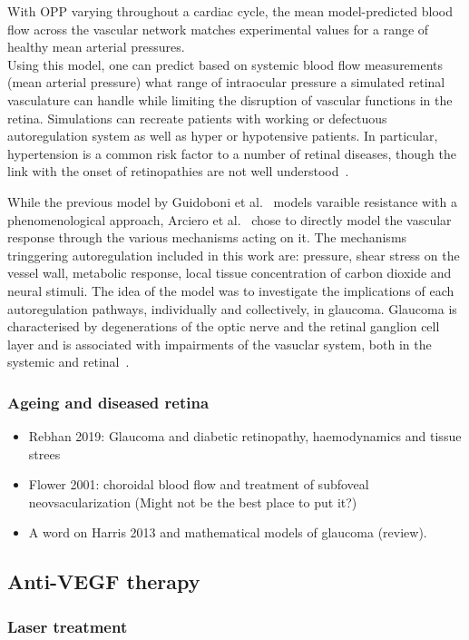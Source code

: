 \documentclass[12pt,a4paper]{article}
\begin{document}
With OPP varying throughout a cardiac cycle, the mean model-predicted blood flow across the vascular network matches experimental values for a range of healthy mean arterial pressures.\\
Using this model, one can predict based on systemic blood flow measurements (mean arterial pressure) what range of intraocular pressure a simulated retinal vasculature can handle while limiting the disruption of vascular functions in the retina.
Simulations can recreate patients with working or defectuous autoregulation system as well as hyper or hypotensive patients.
In particular, hypertension is a common risk factor to a number of retinal diseases, though the link with the onset of retinopathies are not well understood~\cite{Klein_2004, Leeman_2019}.

While the previous model by Guidoboni et al.~\cite{Guidoboni_2014b} models varaible resistance with a phenomenological approach, Arciero et al.~\cite{Arciero_2013} chose to directly model the vascular response through the various mechanisms acting on it.
The mechanisms tringgering autoregulation included in this work are: pressure, shear stress on the vessel wall, metabolic response, local tissue concentration of carbon dioxide and neural stimuli.
The idea of the model was to investigate the implications of each autoregulation pathways, individually and collectively, in glaucoma.
Glaucoma is characterised by degenerations of the optic nerve and the retinal ganglion cell layer and is associated with impairments of the vasuclar system, both in the systemic and retinal~\cite{Hulsman_2007, Bonomi_2000}.


\subsubsection{Ageing and diseased retina}
\begin{itemize}
\item Rebhan 2019: Glaucoma and diabetic retinopathy, haemodynamics and tissue strees
\item Flower 2001: choroidal blood flow and treatment of subfoveal neovsacularization (Might not be the best place to put it?)
\item A word on Harris 2013 and mathematical models of glaucoma (review).
\end{itemize}

\subsection{Anti-VEGF therapy}

\subsubsection{Laser treatment}

{\normalsize }
\end{document}
